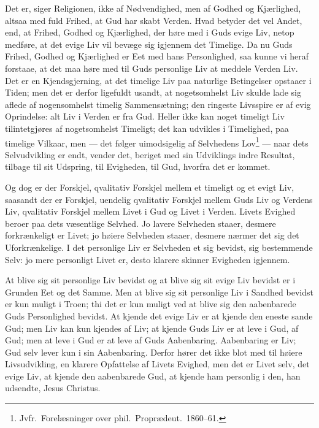\documentclass[12pt]{book}
\begin{document}
Det er, siger Religionen, ikke af Nødvendighed, men af Godhed og
Kjærlighed, altsaa med fuld Frihed, at Gud har skabt Verden. Hvad
betyder det vel Andet, end, at Frihed, Godhed og Kjærlighed, der
høre med i Guds evige Liv, netop medføre, at det evige Liv vil
bevæge sig igjennem det Timelige. Da nu Guds Frihed, Godhed og
Kjærlighed er Eet med hans Personlighed, saa kunne vi heraf
forstaae, at det maa høre med til Guds personlige Liv at meddele
Verden Liv. Det er en Kjendsgjerning, at det timelige Liv paa
naturlige Betingelser opstaaer i Tiden; men det er derfor ligefuldt
usandt, at nogetsomhelst Liv skulde lade sig aflede af
nogensomhelst timelig Sammensætning; den ringeste Livsspire er af
evig Oprindelse: alt Liv i Verden er fra Gud. Heller ikke kan noget
timeligt Liv tilintetgjøres af nogetsomhelst Timeligt; det kan
udvikles i Timelighed, paa timelige Vilkaar, men --- det følger
uimodsigelig af Selvhedens
Lov\footnote{Jvfr.\ Forelæsninger over phil.\ Proprædeut.\
1860--61.} --- naar dets Selvudvikling er endt, vender det, beriget
med sin Udviklings indre Resultat, tilbage til sit Udspring, til
Evigheden, til Gud, hvorfra det er kommet.

Og dog er der Forskjel, qvalitativ Forskjel mellem et timeligt og et
evigt Liv, saasandt der er Forskjel, uendelig qvalitativ Forskjel
mellem Guds Liv og Verdens Liv, qvalitativ Forskjel mellem Livet i
Gud og Livet i Verden. Livets Evighed beroer paa dets væsentlige
Selvhed. Jo lavere Selvheden staaer, desmere forkrænkeligt er
Livet; jo høiere Selvheden staaer, desmere nærmer det sig det
Uforkrænkelige. I det personlige Liv er Selvheden et sig bevidst,
sig bestemmende Selv: jo mere personligt Livet er, desto klarere
skinner Evigheden igjennem.

At blive sig sit personlige Liv bevidst og at blive sig sit evige
Liv bevidst er i Grunden Eet og det Samme. Men at blive sig sit
personlige Liv i Sandhed bevidst er kun muligt i Troen; thi det er
kun muligt ved at blive sig den aabenbarede Guds Personlighed
bevidst. At kjende det evige Liv er at kjende den eneste sande Gud;
men Liv kan kun kjendes af Liv; at kjende Guds Liv er at leve i Gud,
af Gud; men at leve i Gud er at leve af Guds Aabenbaring.
Aabenbaring er Liv; Gud selv lever kun i sin Aabenbaring. Derfor
hører det ikke blot med til høiere Livsudvikling, en klarere
Opfattelse af Livets Evighed, men det er Livet selv, det evige Liv,
at kjende den aabenbarede Gud, at kjende ham personlig i den, han
udsendte, Jesus Christus.
\end{document}
